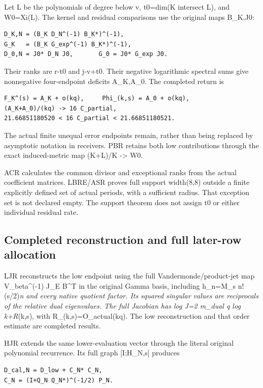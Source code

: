 \documentclass[
]{article}
\begin{document}
Let L be the polynomials of degree below v, t0=dim(K intersect L), and
W0=Xi(L). The kernel and residual comparisons use the original maps
B\_K,J0:

\begin{verbatim}
D_K,N = (B_K D_N^(-1) B_K*)^(-1),
G_K   = (B_K G_exp^(-1) B_K*)^(-1),
D_0,N = J0* D_N J0,       G_0 = J0* G_exp J0.
\end{verbatim}

Their ranks are r-t0 and j-v+t0. Their negative logarithmic spectral
sums give nonnegative four-endpoint deficits A\_K,A\_0. The completed
return is

\begin{verbatim}
F_K^(s) = A_K + o(kq),     Phi_(k,s) = A_0 + o(kq),
(A_K+A_0)/(kq) -> 16 C_partial,
21.66851180520 < 16 C_partial < 21.66851180521.
\end{verbatim}

The actual finite unequal error endpoints remain, rather than being
replaced by asymptotic notation in receivers. PBR retains both low
contributions through the exact induced-metric map (K+L)/K
-\textgreater{} W0.

ACR calculates the common divisor and exceptional ranks from the actual
coefficient matrices. LBRE/ASR proves full support width(8,8) outside a
finite explicitly defined set of actual periods, with a sufficient
radius. That exception set is not declared empty. The support theorem
does not assign t0 or either individual residual rate.

\subsection{Completed reconstruction and full later-row
allocation}\label{completed-reconstruction-and-full-later-row-allocation}

LJR reconstructs the low endpoint using the full Vandermonde/product-jet
map V\_beta\^{}(-1) J\_E B\^{}T in the original Gamma basis, including
h\_n=M\_s n!(s/2)\emph{n and every native quotient factor. Its squared
singular values are reciprocals of the relative dual eigenvalues. The
full Jacobian has log J=2 m\_dual q log k+R}(k,s), with
R\_(k,s)=O\_actual(kq). The low reconstruction and that order estimate
are completed results.

HJR extends the same lower-evaluation vector through the literal
original polynomial recurrence. Its full graph {[}I;H\_N,s{]} produces

\begin{verbatim}
D_cal,N = D_low + C_N* C_N,
C_N = (I+Q_N Q_N*)^(-1/2) P_N.
\end{verbatim}
\end{document}

